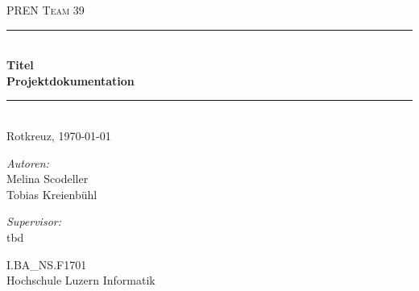 \begin{titlepage}   

\begin{center}
\textsc{\Large PREN Team 39}\\[0.5cm]

\newcommand{\HRule}{\rule{\linewidth}{0.5mm}}
\HRule \\[0.4cm]
{ \huge \bfseries Titel}\\[0.4cm]
{ \LARGE \bfseries Projektdokumentation}\\[0.4cm]
\HRule \\[1.5cm]

{\large Rotkreuz, \today}

\begin{figure}[H]%
\centering
\label{fig:title}
\end{figure}
\begin{minipage}{0.4\textwidth}
\begin{flushleft} \large
\emph{Autoren:}\\
Melina Scodeller\\
Tobias Kreienbühl\\
\end{flushleft}
\end{minipage}
\hfill
\begin{minipage}{0.4\textwidth}
\begin{flushright} \large
\emph{Supervisor:} \\
tbd
\end{flushright}
\end{minipage}
\large
\vfill
I.BA\_NS.F1701 \\
Hochschule Luzern Informatik

\end{center}

\end{titlepage}
